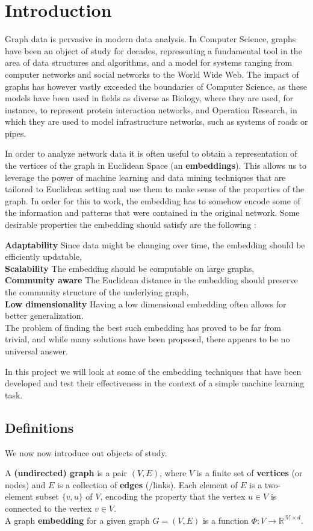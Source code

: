 \section{Introduction}
Graph data is pervasive in modern data analysis. In Computer Science, graphs have been an object of study for decades, representing a fundamental tool in the area of data structures and algorithms, and a model for systems ranging from computer networks and social networks to the World Wide Web. The impact of graphs has however vastly exceeded the boundaries of Computer Science, as these models have been used in fields as diverse as Biology, where they are used, for instance, to represent protein interaction networks, and Operation Research, in which they are used to model infrastructure networks, such as systems of roads or pipes.

In order to analyze network data it is often useful to obtain a representation of the vertices of the graph in Euclidean Space (an \textbf{embeddings}). This allows us to leverage the power of machine learning and data mining techniques that are tailored to Euclidean setting and use them to make sense of the properties of the graph. In order for this to work, the embedding has to somehow encode some of the information and patterns that were contained in the original network. Some desirable properties the embedding should satisfy are the following \cite{chen2018tutorial}:

\textbf{Adaptability} Since data might be changing over time, the embedding should be efficiently updatable,\\
\textbf{Scalability} The embedding should be computable on large graphs,\\
\textbf{Community aware} The Euclidean distance in the embedding should preserve the community structure of the underlying graph,\\
\textbf{Low dimensionality} Having a low dimensional embedding often allows for better generalization.\\


The problem of finding the best such embedding has proved to be far from trivial, and while many solutions have been proposed, there appears to be no universal answer.

In this project we will look at some of the embedding techniques that have been developed and test their effectiveness in the context of a simple machine learning task.


\subsection*{Definitions}
We now now introduce out objects of study.

A \textbf{(undirected) graph} is a pair $(V,E)$, where $V$ is a finite set of \textbf{vertices} (or nodes) and $E$ is a collection of \textbf{edges} (/links). Each element of $E$ is a two-element subset $\{v,u\}$ of $V$, encoding the property that the vertex $u \in V$ is connected to the vertex $v \in V$.\\

A graph \textbf{embedding} for a given graph $G = (V,E)$ is a function $\Phi:V \to \mathbb{R}^{|V| \times d}$.
